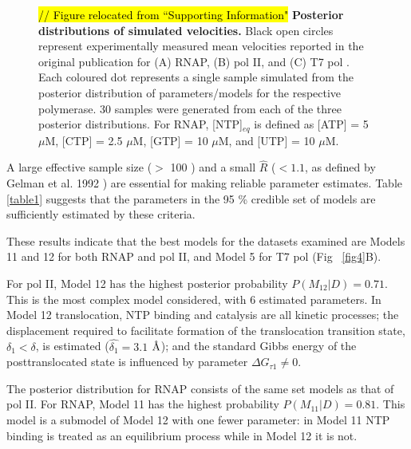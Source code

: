 \documentclass[10pt,letterpaper]{article}
\newcommand{\angstrom}{\mbox{\normalfont\AA}}
\begin{document}
\begin{figure}[!h]
\caption{\hl{// Figure relocated from ``Supporting Information"} \textbf{Posterior distributions of simulated velocities.} Black open circles represent experimentally measured mean velocities reported in the original publication for (A) RNAP,  (B) pol II, and (C) T7 pol \cite{abbondanzieri2005direct,schweikhard2014transcription,thomen2008t7}. Each coloured dot represents a single sample simulated from the posterior distribution of parameters/models for the respective polymerase. 30 samples were generated from each of the three posterior distributions. For RNAP, [NTP]$_{eq}$ is defined as [ATP] = 5 $\mu$M, [CTP] = 2.5 $\mu$M, [GTP] = 10 $\mu$M, and [UTP] = 10 $\mu$M. }
\label{fig6}
\end{figure}









A large effective sample size ($>$ 100 \cite{rambaut2013tracer}) and a small $\hat{R}$ ($< 1.1$, as defined by Gelman et al. 1992  \cite{gelman1992inference, brooks2011handbook, brooks1998general}) are essential for making reliable parameter estimates. Table \ref{table1} suggests that the parameters in the 95 \% credible set of models are sufficiently estimated by these criteria.





These results indicate that the best models for the datasets examined are Models 11 and 12 for both RNAP and pol II, and Model 5 for T7 pol (Fig ~\ref{fig4}B).



For  pol II, Model 12 has the highest posterior probability $P(M_{12}|D) = 0.71$. This is the most complex model considered, with 6 estimated parameters. In Model 12 translocation, NTP binding and catalysis are all kinetic processes; the displacement required to facilitate formation of the translocation transition state, $\delta_1 < \delta$, is estimated ($\hat{\delta_1} = 3.1$ $\angstrom$); and the standard Gibbs energy of the posttranslocated state is influenced by parameter $\Delta G_{\tau 1} \neq 0$. \par

The posterior distribution for  RNAP  consists of the same set models as that of pol II. For RNAP, Model 11 has the highest probability $P(M_{11}|D) = 0.81$. This model is a submodel of Model 12 with one fewer parameter: in Model 11 NTP binding is treated as an equilibrium process while in Model 12 it is not. \par
\end{document}
